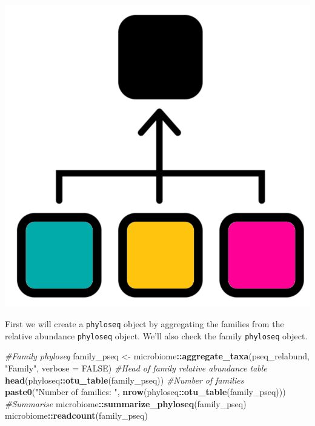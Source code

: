 \documentclass[
]{book}
\newenvironment{Shaded}{\begin{snugshade}}{\end{snugshade}}
\newcommand{\AttributeTok}[1]{\textcolor[rgb]{0.13,0.29,0.53}{#1}}
\newcommand{\CommentTok}[1]{\textcolor[rgb]{0.56,0.35,0.01}{\textit{#1}}}
\newcommand{\ConstantTok}[1]{\textcolor[rgb]{0.56,0.35,0.01}{#1}}
\newcommand{\FunctionTok}[1]{\textcolor[rgb]{0.13,0.29,0.53}{\textbf{#1}}}
\newcommand{\NormalTok}[1]{#1}
\newcommand{\OtherTok}[1]{\textcolor[rgb]{0.56,0.35,0.01}{#1}}
\newcommand{\SpecialCharTok}[1]{\textcolor[rgb]{0.81,0.36,0.00}{\textbf{#1}}}
\newcommand{\StringTok}[1]{\textcolor[rgb]{0.31,0.60,0.02}{#1}}
\begin{document}
\includegraphics{figures/aggregate_taxa.png}

First we will create a \texttt{phyloseq} object by aggregating the families from the relative abundance \texttt{phyloseq} object.
We'll also check the family \texttt{phyloseq} object.

\begin{Shaded}
\begin{Highlighting}[]
\CommentTok{\#Family phyloseq}
\NormalTok{family\_pseq }\OtherTok{\textless{}{-}}\NormalTok{ microbiome}\SpecialCharTok{::}\FunctionTok{aggregate\_taxa}\NormalTok{(pseq\_relabund, }\StringTok{"Family"}\NormalTok{, }\AttributeTok{verbose =} \ConstantTok{FALSE}\NormalTok{)}
\CommentTok{\#Head of family relative abundance table}
\FunctionTok{head}\NormalTok{(phyloseq}\SpecialCharTok{::}\FunctionTok{otu\_table}\NormalTok{(family\_pseq))}
\CommentTok{\#Number of families}
\FunctionTok{paste0}\NormalTok{(}\StringTok{"Number of families: "}\NormalTok{, }\FunctionTok{nrow}\NormalTok{(phyloseq}\SpecialCharTok{::}\FunctionTok{otu\_table}\NormalTok{(family\_pseq)))}
\CommentTok{\#Summarise}
\NormalTok{microbiome}\SpecialCharTok{::}\FunctionTok{summarize\_phyloseq}\NormalTok{(family\_pseq)}
\NormalTok{microbiome}\SpecialCharTok{::}\FunctionTok{readcount}\NormalTok{(family\_pseq)}
\end{Highlighting}
\end{Shaded}
\end{document}
